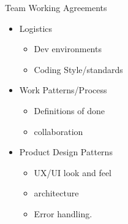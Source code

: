 \documentclass{report}
\begin{document}
\begin{description}
    \item Team Working Agreements
        \begin{itemize}
            \item Logistics
                \begin{itemize}
                    \item Dev environments
                    \item Coding Style/standards
                \end{itemize}
            \item Work Patterns/Process
                \begin{itemize}
                    \item Definitions of done
                    \item collaboration
                \end{itemize}
            \item Product Design Patterns
                \begin{itemize}
                    \item UX/UI look and feel
                    \item architecture
                    \item Error handling.
                \end{itemize}
        \end{itemize}


\end{description}
\end{document}
